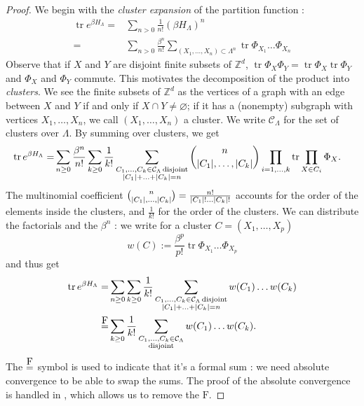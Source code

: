 \documentclass[french]{article}
\DeclarePairedDelimiter\abs{\lvert}{\rvert}
\DeclareMathOperator{\disj}{disjoint}
\DeclareMathOperator{\tr}{tr}
\newcommand\formeq{\stackrel{\mathclap{\normalfont\mbox{F}}}{=}}
\begin{document}
 \begin{proof}
     We begin with the {\it cluster expansion} of the partition function :
     \begin{align*}
         \tr e^{\beta H_\Lambda}=&\sum_{n>0}\frac{1}{n!}(\beta H_\Lambda)^n\\
         =&\sum_{n>0}\frac{\beta^n}{n!}\sum_{(X_1,\ldots, X_n)\subset \Lambda^n}\tr\Phi_{X_1}\ldots\Phi_{X_n}
     \end{align*}
     Observe that if $X$ and $Y$ are disjoint finite subsets of $\mathbb Z^d$, $\tr \Phi_X\Phi_Y=\tr \Phi_X \tr\Phi_Y$ and $\Phi_X$ and $\Phi_Y$ commute.
    This motivates the decomposition of the product into {\it clusters}.
    We see the finite subsets of $\mathbb Z^d$ as the vertices of a graph with an edge between $X$ and $Y$ if and only if $X\cap Y\neq \varnothing$; if it has a (nonempty) subgraph with vertices $X_1,\ldots,X_n$, we call $(X_1,\ldots,X_n)$ a cluster.
    We write $\mathcal C_\Lambda$ for the set of clusters over $\Lambda$.
    By summing over clusters, we get 
    \begin{align*}
        \tr e^{\beta H_\Lambda}=&\sum_{n\geq0}\frac {\beta^n} {n!} \sum_{k\geq 0}\frac{1}{k!}\sum_{\substack{C_1,\ldots,C_k\in\mathcal C_\Lambda \disj\\\abs{C_1}+\ldots+\abs{C_k}=n}}\binom{n}{\abs{C_1},\ldots,\abs{C_k}}\prod_{i=1,\ldots,k}\tr\prod_{X\in C_i}\Phi_X.
    \end{align*}
    The multinomial coefficient $\binom{n}{\abs{C_1},\ldots,\abs{C_k}}=\frac{n!}{\abs{C_1}!\ldots\abs{C_k}!}$ accounts for the order of the elements inside the clusters, and $\frac{1}{k!}$ for the order of the clusters.
    We can distribute the factorials and the $\beta^n$ : we write for a cluster $C=(X_1,\ldots,X_p)$
    $$
    w(C):=\frac {\beta^p}{p!}\tr \Phi_{X_1}\ldots\Phi_{X_p}
    $$
    and thus get 
    \begin{align*}
        \tr e^{\beta H_\Lambda}=&\sum_{n\geq0}\sum_{k\geq 0}\frac 1{k!}\sum_{\substack{C_1,\ldots,C_k\in\mathcal C_\Lambda \disj\\\abs{C_1}+\ldots+\abs{C_k}=n}}w(C_1)\ldots w(C_k)\\
        \formeq&\sum_{k\geq 0}\frac 1{k!} \sum_{\substack{C_1,\ldots,C_k\in\mathcal C_\Lambda\\\disj}}w(C_1)\ldots w(C_k).
    \end{align*}
    The $\formeq$ symbol is used to indicate that it’s a formal sum : we need absolute convergence to be able to swap the sums. 
    The proof of the absolute convergence is handled in \cite{friedliChapterClusterExpansion2017}, which allows us to remove the $\text{F}$.
     \end{proof}
 
 
 
 \printbibliography
\end{document}
